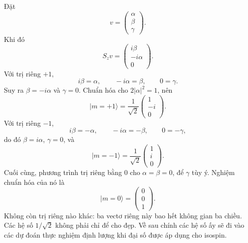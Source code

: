 Đặt
\begin{equation}
v=
\begin{pmatrix}
\alpha\\
\beta\\
\gamma
\end{pmatrix}.
\end{equation}
Khi đó
\begin{equation}
S_zv
=
\begin{pmatrix}
i\beta\\
-i\alpha\\
0
\end{pmatrix}.
\end{equation}
Với trị riêng \(+1\),
\begin{equation}
i\beta=\alpha,
\qquad
-i\alpha=\beta,
\qquad
0=\gamma.
\end{equation}
Suy ra \(\beta=-i\alpha\) và \(\gamma=0\). Chuẩn hóa cho \(2|\alpha|^2=1\), nên
\begin{equation}
|m=+1\rangle
=
\frac{1}{\sqrt2}
\begin{pmatrix}
1\\
-i\\
0
\end{pmatrix}.
\end{equation}
Với trị riêng \(-1\),
\begin{equation}
i\beta=-\alpha,
\qquad
-i\alpha=-\beta,
\qquad
0=-\gamma,
\end{equation}
do đó \(\beta=i\alpha\), \(\gamma=0\), và
\begin{equation}
|m=-1\rangle
=
\frac{1}{\sqrt2}
\begin{pmatrix}
1\\
i\\
0
\end{pmatrix}.
\end{equation}
Cuối cùng, phương trình trị riêng bằng 0 cho \(\alpha=\beta=0\), để \(\gamma\) tùy ý. Nghiệm chuẩn hóa của nó là
\begin{equation}
|m=0\rangle
=
\begin{pmatrix}
0\\
0\\
1
\end{pmatrix}.
\end{equation}
Không còn trị riêng nào khác: ba vectơ riêng này bao hết không gian ba chiều. Các hệ số \(1/\sqrt2\) không phải chỉ để cho đẹp. Về sau chính các hệ số ấy sẽ đi vào các dự đoán thực nghiệm định lượng khi đại số được áp dụng cho isospin.

\begin{classroomqa}
\end{classroomqa}

